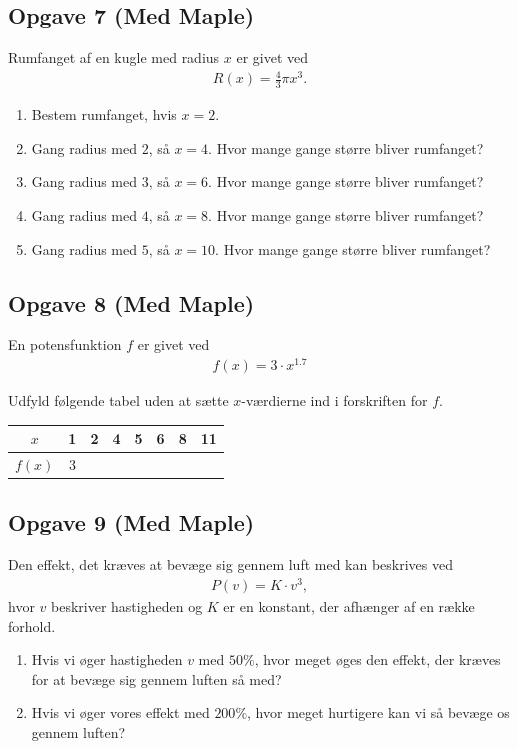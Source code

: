 \subsection*{Opgave 7 (Med Maple)}
Rumfanget af en kugle med radius $x$ er givet ved
\begin{align*}
	R(x) = \frac{4}{3}\pi x^3.
\end{align*}
\begin{enumerate}[label = \roman*)]
	\item Bestem rumfanget, hvis $x = 2$.
	\item Gang radius med $2$, så $x = 4$. Hvor mange gange større bliver rumfanget?
	\item Gang radius med $3$, så $x = 6$. Hvor mange gange større bliver rumfanget?
	\item Gang radius med $4$, så $x = 8$. Hvor mange gange større bliver rumfanget?
	\item Gang radius med $5$, så $x = 10$. Hvor mange gange større bliver rumfanget?
\end{enumerate}

\subsection*{Opgave 8 (Med Maple)}
En potensfunktion $f$ er givet ved
\begin{align*}
	f(x) = 3 \cdot x^{1.7}
\end{align*}

Udfyld følgende tabel uden at sætte $x$-værdierne ind i forskriften for $f$.
\begin{center}
	\begin{tabular}{c|c|c|c|c|c|c|c}
		$x$ & 1 & 2 & 4 & 5 & 6 & 8 & 11 \\ \hline
		$f(x)$ & 3 & & & & & &
	\end{tabular}
\end{center}

\subsection*{Opgave 9 (Med Maple)}
Den effekt, det kræves at bevæge sig gennem luft med kan beskrives ved 
\begin{align*}
P(v) = K\cdot v^3,
\end{align*}
hvor $v$ beskriver hastigheden og $K$ er en konstant, der afhænger af en række forhold.
\begin{enumerate}[label=\roman*)]
\item Hvis vi øger hastigheden $v$ med $50\%$, hvor meget øges den effekt, der kræves for at bevæge sig gennem luften så med? 
\item Hvis vi øger vores effekt med $200\%$, hvor meget hurtigere kan vi så bevæge os gennem luften?
\end{enumerate}
